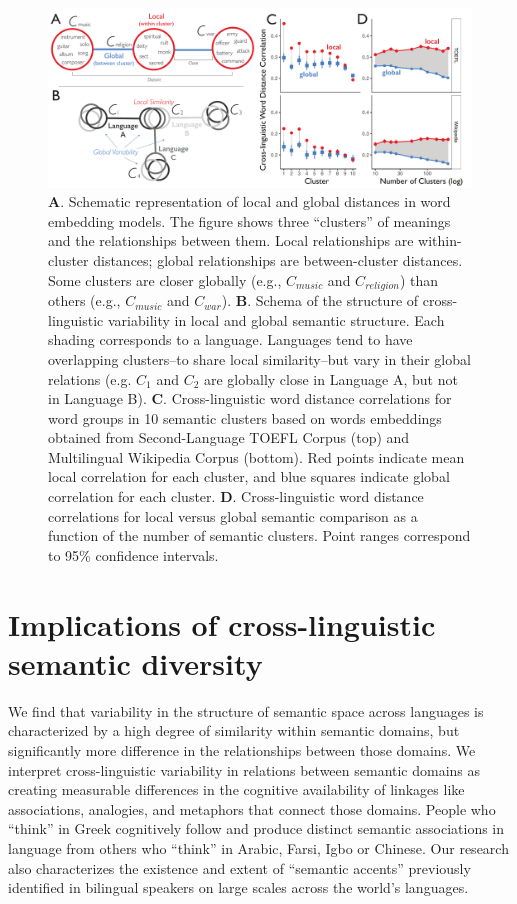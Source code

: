\documentclass[9pt,twocolumn,twoside,lineno]{pnas-new}
\begin{document}
\begin{figure}[t!]
\centering
\includegraphics[width=16cm]{figs/fig3.pdf}
\caption{{\textbf A.} Schematic representation of local and global distances in word embedding models. The figure shows three ``clusters'' of meanings and the relationships between them. Local relationships are within-cluster distances; global relationships are between-cluster distances. Some clusters are closer globally (e.g., $C_{music}$ and $C_{religion}$) than others (e.g., $C_{music}$ and $C_{war}$). {\textbf B.} Schema of the structure of cross-linguistic variability in local and global semantic structure. Each shading corresponds to a language. Languages tend to have overlapping clusters--to share local similarity--but vary in their global relations (e.g.  $C_{1}$ and $C_{2}$ are globally close in Language A, but not in Language B). {\textbf C.} Cross-linguistic word distance correlations for word groups in 10 semantic clusters based on words embeddings obtained from Second-Language TOEFL Corpus (top) and Multilingual Wikipedia Corpus (bottom). Red points indicate mean local correlation for each cluster, and blue squares indicate global correlation for each cluster.  {\textbf D.} Cross-linguistic word distance correlations for local versus global semantic comparison as a function of the number of semantic clusters. Point ranges correspond to 95\% confidence intervals.}
\label{fig:localglobal} 
\end{figure}





\section*{Implications of cross-linguistic semantic diversity}
We find that variability in the structure of semantic space across languages is characterized by a high degree of similarity within semantic domains, but significantly more difference in the relationships between those domains. We interpret cross-linguistic variability in relations between semantic domains as creating measurable differences in the cognitive availability of linkages like associations, analogies, and metaphors that connect those domains. People who ``think'' in Greek cognitively follow and produce distinct semantic associations in language from others who ``think'' in Arabic, Farsi, Igbo or Chinese. Our research also characterizes the existence and extent of ``semantic accents'' previously identified in bilingual speakers \cite{matsuki2021understanding, dong2005shared} on large scales across the world's languages. 
\end{document}
